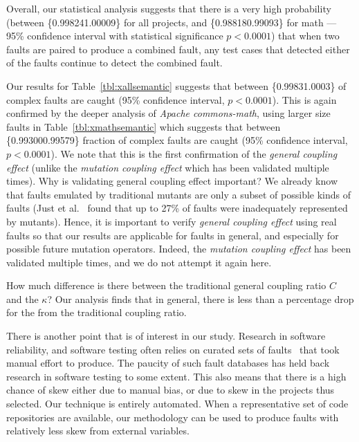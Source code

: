 \documentclass[preprint,nonatbib]{sigplanconf}\usepackage[]{graphicx}\usepackage[]{color}
\begin{document}
Overall, our statistical analysis suggests that there is a very high
probability (between
\{0.998241.00009\} for all projects, and
\{0.988180.99093\} for math ---
95\% confidence interval with statistical significance $p < 0.0001$) that when
two faults are paired to produce a combined fault, any test cases that detected
either of the faults continue to detect the combined fault.

Our results for Table~\ref{tbl:xallsemantic} suggests that between
\{0.99831.0003\} of complex
faults are caught (95\% confidence interval, $p < 0.0001$).
This is again confirmed by the deeper analysis of
\emph{Apache commons-math}, using larger size faults in Table~\ref{tbl:xmathsemantic}
which suggests that between
\{0.993000.99579\} fraction of complex
faults are caught (95\% confidence interval, $p < 0.0001$).
We note that this is the first confirmation of the \emph{general coupling effect}
(unlike the \emph{mutation coupling effect} which has been validated multiple times).
Why is validating general coupling effect important? We already know that faults
emulated by traditional mutants are only a subset of possible kinds of faults
(Just et al.~\cite{just2014mutants} found that up to 27\% of faults were inadequately
represented by mutants). Hence, it is important to verify \emph{general coupling
effect} using real faults so that our results are applicable for faults in
general, and especially for possible future mutation operators. Indeed,
the \emph{mutation coupling effect} has been
validated multiple times, and we do not attempt it again here.

How much difference is there between the traditional general coupling ratio $C$ and
the \kappaT $\kappa$? Our analysis finds that in general, there is less than a percentage
drop for the \kappaT from the traditional coupling ratio.


There is another point that is of interest in our study. Research in software
reliability, and software testing often relies on curated sets of
faults~\cite{just2014mutants,demillo1991on} that took manual effort to produce.
The paucity of such fault databases has held back research in software testing
to some extent. This also means that there is a high chance of skew either due to
manual bias, or due to skew in the projects thus selected.
Our technique is entirely automated. When a representative set of code
repositories are available, our methodology can be used to produce faults with
relatively less skew from external variables.
\end{document}
